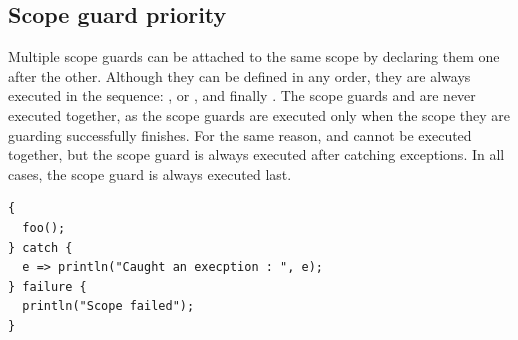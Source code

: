 \subsection{Scope guard priority}

Multiple scope guards can be attached to the same scope by declaring them one
after the other. Although they can be defined in any order, they are always
executed in the sequence: ,  or , and
finally . The scope guards  and  are
never executed together, as the  scope guards are executed only
when the scope they are guarding successfully finishes. For the same reason,
 and  cannot be executed together, but the
 scope guard is always executed after catching exceptions. In all
cases, the  scope guard is always executed last.

\begin{lstlisting}[style=coloredverbatim]
{
  foo();
} catch {
  e => println("Caught an execption : ", e);
} failure {
  println("Scope failed");
}
\end{lstlisting}

\vfill%
\pagebreak

